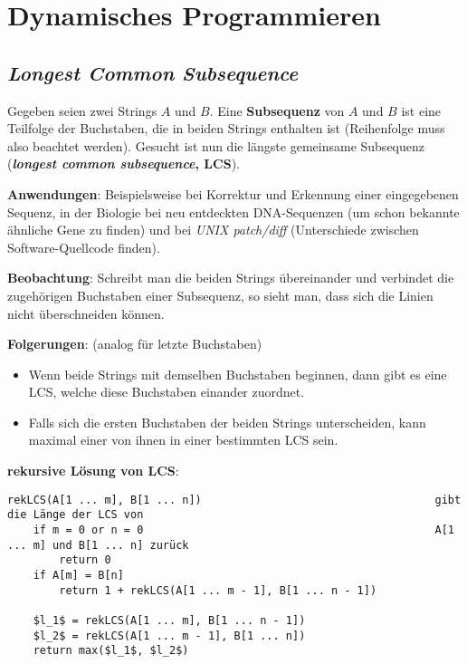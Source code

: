 \section{%
    Dynamisches Programmieren%
}

\subsection{%
    \emph{Longest Common Subsequence}%
}

Gegeben seien zwei Strings $A$ und $B$.
Eine \textbf{Subsequenz} von $A$ und $B$ ist eine Teilfolge der Buchstaben, die
in beiden Strings enthalten ist (Reihenfolge muss also beachtet werden).
Gesucht ist nun die längste gemeinsame Subsequenz
(\textbf{\emph{longest common subsequence}, LCS}).

\textbf{Anwendungen}:
Beispielsweise bei Korrektur und Erkennung einer eingegebenen Sequenz,
in der Biologie bei neu entdeckten DNA-Sequenzen (um schon bekannte ähnliche
Gene zu finden) und bei \emph{UNIX patch/diff}
(Unterschiede zwischen Software-Quellcode finden).

\linie

\textbf{Beobachtung}:
Schreibt man die beiden Strings übereinander und verbindet die zugehörigen
Buchstaben einer Subsequenz, so sieht man, dass sich die Linien nicht
überschneiden können.

\textbf{Folgerungen}:
(analog für letzte Buchstaben)
\begin{itemize}
    \item
    Wenn beide Strings mit demselben Buchstaben beginnen, dann gibt es eine
    LCS, welche diese Buchstaben einander zuordnet.

    \item
    Falls sich die ersten Buchstaben der beiden Strings unterscheiden,
    kann maximal einer von ihnen in einer bestimmten LCS sein.
\end{itemize}

\linie

\textbf{rekursive Lösung von LCS}:
\begin{lstlisting}
rekLCS(A[1 ... m], B[1 ... n])                                    gibt die Länge der LCS von
    if m = 0 or n = 0                                             A[1 ... m] und B[1 ... n] zurück
        return 0
    if A[m] = B[n]
        return 1 + rekLCS(A[1 ... m - 1], B[1 ... n - 1])

    $l_1$ = rekLCS(A[1 ... m], B[1 ... n - 1])
    $l_2$ = rekLCS(A[1 ... m - 1], B[1 ... n])
    return max($l_1$, $l_2$)
\end{lstlisting}

